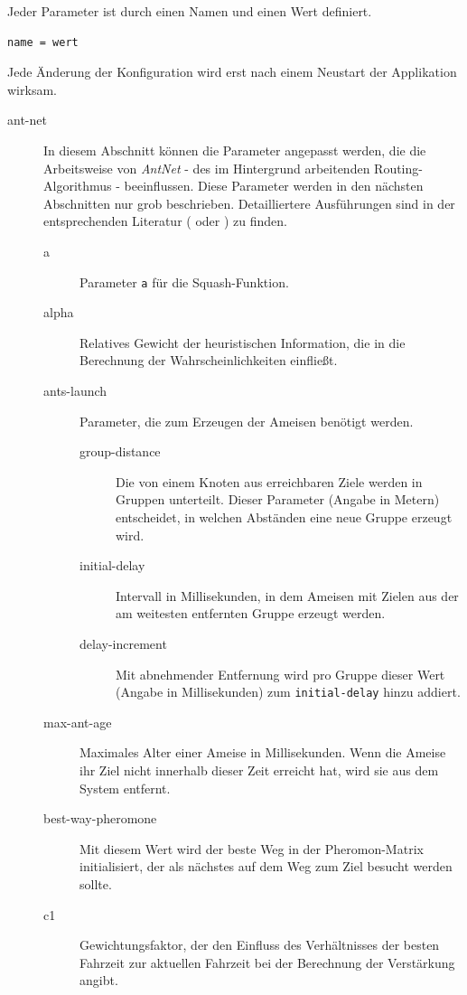 Jeder Parameter ist durch einen Namen und einen Wert definiert.

\begin{lstlisting}
name = wert
\end{lstlisting}

Jede Änderung der Konfiguration wird erst nach einem Neustart der Applikation wirksam.

\begin{description}
  \item[ant-net] In diesem Abschnitt können die Parameter angepasst werden, die die Arbeitsweise von \textit{AntNet} - des im Hintergrund arbeitenden Routing-Algorithmus - beeinflussen.
    Diese Parameter werden in den nächsten Abschnitten nur grob beschrieben.
    Detailliertere Ausführungen sind in der entsprechenden Literatur (\cite{DorigoStuetzle2004} oder \cite{Walther2006}) zu finden.
    \begin{description}
      \item[a] Parameter \texttt{a} für die Squash-Funktion.
      \item[alpha] Relatives Gewicht der heuristischen Information, die in die Berechnung der Wahrscheinlichkeiten einfließt.
      \item[ants-launch] Parameter, die zum Erzeugen der Ameisen benötigt werden.
        \begin{description}
          \item[group-distance] Die von einem Knoten aus erreichbaren Ziele werden in Gruppen unterteilt.
            Dieser Parameter (Angabe in Metern) entscheidet, in welchen Abständen eine neue Gruppe erzeugt wird.
          \item[initial-delay] Intervall in Millisekunden, in dem Ameisen mit Zielen aus der am weitesten entfernten Gruppe erzeugt werden.
          \item[delay-increment] Mit abnehmender Entfernung wird pro Gruppe dieser Wert (Angabe in Millisekunden) zum \texttt{initial-delay} hinzu addiert.
        \end{description}
      \item[max-ant-age] Maximales Alter einer Ameise in Millisekunden.
        Wenn die Ameise ihr Ziel nicht innerhalb dieser Zeit erreicht hat, wird sie aus dem System entfernt.
      \item[best-way-pheromone] Mit diesem Wert wird der beste Weg in der Pheromon-Matrix initialisiert, der als nächstes auf dem Weg zum Ziel besucht werden sollte.
      \item[c1] Gewichtungsfaktor, der den Einfluss des Verhältnisses der besten Fahrzeit zur aktuellen Fahrzeit bei der Berechnung der Verstärkung angibt.

\end{description}
\end{description}
